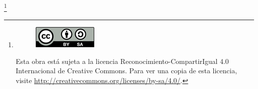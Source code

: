 \cleardoublepage
\let\thefootnote\relax\footnote{

 \begin{figure}[H]
 	\centering
    \includegraphics[scale=4]{img/by-sa_petit}
 \end{figure}

Esta obra está sujeta a la licencia Reconocimiento-CompartirIgual 4.0 Internacional de Creative Commons. Para ver una copia de esta licencia, visite \url{http://creativecommons.org/licenses/by-sa/4.0/}.
}

